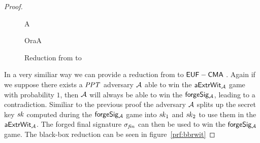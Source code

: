 \begin{proof}
\begin{figure}
    \begin{center}
        \begin{bbrenv}{A}
            \begin{bbrbox}[name=\cnstEUFCMA]
            \end{bbrbox}
            \begin{bbroracle}{OraA}
                \begin{bbrbox}[name=$\procSignOracleId$, minheight=1cm]
                \end{bbrbox}
            \end{bbroracle}
            \bbroutput{$\varSignature$}
        \end{bbrenv}
    \end{center}
    \caption{Reduction from \cnstaEUFCMA to \cnstEUFCMA \label{prf:bbreuf}}
\end{figure}

    In a very similiar way we can provide a reduction from \cnstWitnessExtractability to $\mathsf{EUF-CMA\;}$. Again if we suppose there exists a $\mathit{PPT}$ adversary $\mathcal{A}$ able to win the $\mathsf{aExtrWit_{\mathcal{A}}}$ game with probability $1$, then $\mathcal{A}$ will always be able to win the $\mathsf{forgeSig_{\mathcal{A}}}$, leading to a contradiction. Similiar to the previous proof the adversary $\mathcal{A}$ splits up the secret key $\mathit{sk}$ computed during the $\mathsf{forgeSig_{\mathcal{A}}}$ game into $\mathit{sk}_1$ and $\mathit{sk}_2$ to use them in the $\mathsf{aExtrWit_{\mathcal{A}}}$. The forged final signature $\sigma_{\mathit{fin}}$ can then be used to win the $\mathsf{forgeSig_{\mathcal{A}}}$ game. The black-box reduction can be seen in figure~\ref{prf:bbrwit}


\end{proof}
